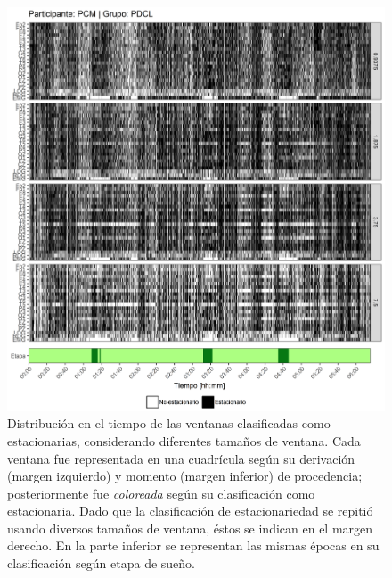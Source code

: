 \begin{figure}
\centering
\includegraphics[width=\linewidth]
{./scripts_graf_res/PCM_patrones_1.png}
\caption[Distribución en el tiempo de las ventanas clasificadas como estacionarias, considerando diferentes tamaños de ventana]{Distribución en el tiempo de las ventanas clasificadas como estacionarias, considerando diferentes tamaños de ventana. 
Cada ventana fue representada en una cuadrícula según su derivación (margen izquierdo) y momento (margen inferior) de procedencia; posteriormente fue \textit{coloreada} según su clasificación como estacionaria.
Dado que la clasificación de estacionariedad se repitió usando diversos tamaños de ventana, éstos se indican en el margen derecho.
En la parte inferior se representan las mismas épocas en su clasificación según etapa de sueño.}
\end{figure}
